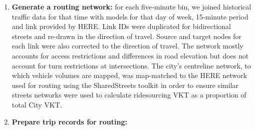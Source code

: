 \documentclass[]{trbunofficial_bdit_final}
\begin{document}
\begin{enumerate}
\def\labelenumi{\arabic{enumi}.}
\item
  \textbf{Generate a routing network:} for each five-minute bin, we
  joined historical traffic data for that time with models for that day of
  week, 15-minute period and link provided by HERE. Link IDs
  were duplicated for bidirectional streets and re-drawn in the direction
  of travel. Source and target nodes for each link were also corrected to the
  direction of travel. The network mostly accounts for access restrictions
  and differences in road elevation but does not account for turn
  restrictions at intersections. The city's centreline network, to which
  vehicle volumes are mapped, was map-matched to the HERE network used for
  routing using the SharedStreets \cite{sharedstreetshowtomatch} toolkit in
  order to ensure similar streets networks were used to calculate
  ridesourcing VKT as a proportion of total City VKT.
\item
  \textbf{Prepare trip records for routing:}


\end{enumerate}
\end{document}
